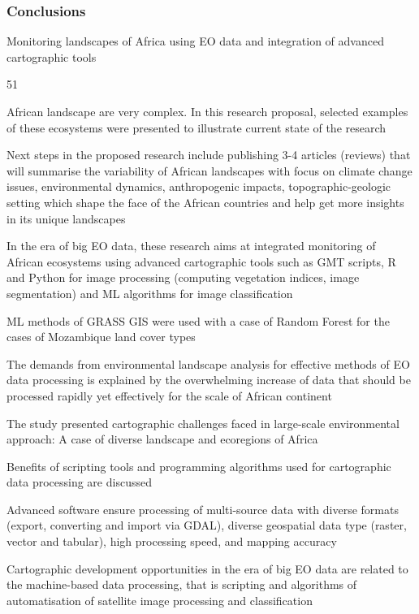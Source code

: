 \documentclass[pdflatex,compress,8pt,
	xcolor={dvipsnames,dvipsnames,svgnames,x11names,table},
	hyperref={colorlinks = true, breaklinks = true, urlcolor = NavyBlue, linkcolor=white, breaklinks = true}]{beamer}
\begin{document}
\begin{frame}\frametitle{Conclusions}

\begin{alertblock}{Monitoring landscapes of Africa using EO data and integration of advanced cartographic tools}
\begin{dinglist}{51}\footnotesize
       \item African landscape are very complex. In this research proposal, selected examples of these ecosystems were presented to illustrate current state of the research
     \item Next steps in the proposed research include publishing 3-4 articles (reviews) that will summarise the variability of African landscapes with focus on climate change issues, environmental dynamics, anthropogenic impacts, topographic-geologic setting which shape the face of the African countries and help get more insights in its unique landscapes
     \item In the era of big EO data, these research aims at integrated monitoring of African ecosystems using advanced cartographic tools such as GMT scripts, R and Python for image processing (computing vegetation indices, image segmentation) and ML algorithms for image classification
     \item ML methods of GRASS GIS were used with a case of Random Forest for the cases of Mozambique land cover types
     \item The demands from environmental landscape analysis for effective methods of EO data processing is explained by the overwhelming increase of data that should be processed rapidly yet effectively for the scale of African continent
     \item The study presented cartographic challenges faced in large-scale environmental approach: A case of diverse landscape and ecoregions of Africa
     \item Benefits of scripting tools and programming algorithms used for cartographic data processing are discussed
     \item Advanced software ensure processing of multi-source data with diverse formats (export, converting and import via GDAL), diverse geospatial data type (raster, vector and tabular), high processing speed, and mapping accuracy
     \item Cartographic development opportunities in the era of big EO data are related to the machine-based data processing, that is scripting and algorithms of automatisation of satellite image processing and classification

\end{dinglist}
\end{alertblock}
\end{frame}
\end{document}
